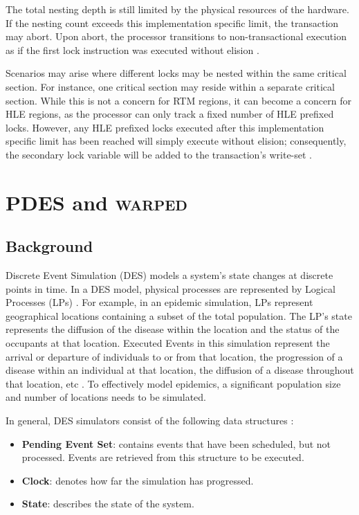 \documentclass[11pt]{book}
\begin{document}
The total nesting depth is still limited by the physical resources of the hardware.  If
the nesting count exceeds this implementation specific limit, the transaction may abort.
Upon abort, the processor transitions to non-transactional execution as if the first lock
instruction was executed without elision \cite{intel_prog_ref}.

Scenarios may arise where different locks may be nested within the same critical section.
For instance, one critical section may reside within a separate critical section.  While
this is not a concern for RTM regions, it can become a concern for HLE regions, as the
processor can only track a fixed number of HLE prefixed locks.  However, any HLE prefixed
locks executed after this implementation specific limit has been reached will simply
execute without elision; consequently, the secondary lock variable will be added to the
transaction's write-set \cite{intel_prog_ref}.


\chapter{PDES and \textsc{warped}}

\section{Background}

Discrete Event Simulation (DES) models a system's state changes at discrete points in
time.  In a DES model, physical processes are represented by Logical Processes (LPs)
\cite{des_misra}.  For example, in an epidemic simulation, LPs represent geographical
locations containing a subset of the total population.  The LP's state represents the
diffusion of the disease within the location and the status of the occupants at that
location.  Executed Events in this simulation represent the arrival or departure of
individuals to or from that location, the progression of a disease within an individual at
that location, the diffusion of a disease throughout that location, etc
\cite{epidemic}. To effectively model epidemics, a significant population size and number
of locations needs to be simulated.

In general, DES simulators consist of the following data structures \cite{fujimoto}:

\vspace*{-\bigskipamount}
\begin{singlespace}
\begin{itemize}
  \item\textbf{Pending Event Set}: contains events that have been scheduled, but not
    processed.  Events are retrieved from this structure to be executed.
  \item\textbf{Clock}: denotes how far the simulation has progressed.
  \item\textbf{State}: describes the state of the system.
\end{itemize}
\end{singlespace}
\end{document}
